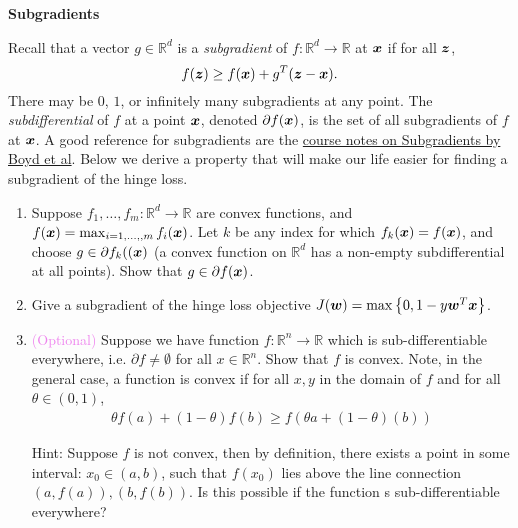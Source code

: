 \documentclass{article}
\newcommand{\nyuparagrah}[1]{\textcolor{nyupurple}{\large #1}}
\theoremstyle{plain}
\theoremstyle{definition}
\begin{document}
\nyuparagrah{\bf Subgradients} 

Recall that a vector $g\in\mathbb{R}^{d}$ is a \emph{subgradient} of
$f:\mathbb{R}^{d}\to\mathbb{R}$ at $\boldsymbol{x}$ if for all $\boldsymbol{z}$, 
\[
f(\boldsymbol{z})\ge f(\boldsymbol{x})+g^{T}(\boldsymbol{z}- \boldsymbol{x}).
\]
There may be $0$, $1$, or infinitely many
subgradients at any point. The \emph{subdifferential} of $f$ at
a point $\boldsymbol{x}$, denoted $\partial f(\boldsymbol{x})$, is the set of all subgradients
of $f$ at $\boldsymbol{x}$. 
  A good reference for subgradients are the \href{https://stanford.edu/class/ee364b/lectures/subgradients_notes.pdf}{course notes on Subgradients by Boyd et al}.
Below we derive a property
that will make our life easier for finding a subgradient of the hinge
loss.

\begin{enumerate}
  \setcounter{enumi}{\value{saveenum}}
\item Suppose $f_{1},\ldots,f_{m}:\mathbb{R}^{d}\to\mathbb{R}$
are convex functions, and 
$f(\boldsymbol{x})=\max_{i=1,\ldots,,m}f_{i}(\boldsymbol{x})$.
Let $k$ be any index for which $f_{k}(\boldsymbol{x})=f(\boldsymbol{x})$, and choose $g\in\partial f_{k}((\boldsymbol{x})$ (a convex function on $\mathbb{R}^{d}$ has
a non-empty subdifferential at all points). Show that $g\in\partial f(\boldsymbol{x})$.

\item Give a subgradient of the hinge loss objective
$J(\boldsymbol{w})=\max\left\{ 0,1-y \boldsymbol{w}^{T} \boldsymbol{x}\right\}$.
 
\item \textcolor{violet}{(Optional)} Suppose we have function $f:\mathbb{R}^n\rightarrow\mathbb{R}$ which is sub-differentiable everywhere, i.e. $\partial f\neq \emptyset$ for all $x\in\mathbb{R}^n$. Show that $f$ is convex. Note, in the general case, a function is convex if for all $x,y$ in the domain of $f$ and for all $\theta \in (0,1)$,
\begin{align*}
    \theta f(a)+(1-\theta)f(b) \geq f(\theta a+(1-\theta)(b))
\end{align*}

Hint: Suppose $f$ is not convex, then by definition, there exists a point in some interval: $x_0\in (a,b)$, such that $f(x_0)$ lies above the line connection $(a,f(a)), (b,f(b))$. Is this possible if the function s sub-differentiable everywhere? 

\setcounter{saveenum}{\value{enumi}}
\end{enumerate}
\end{document}
